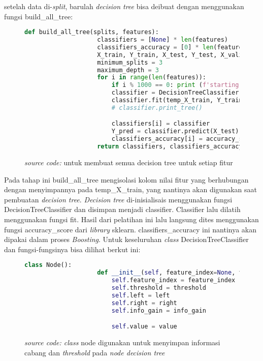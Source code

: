 		setelah data di-\textit{split}, barulah \emph{decision tree} bisa deibuat dengan menggunakan 
		fungsi build\_all\_tree:

		\begin{figure}[H]
			\begin{lstlisting}[language=Python, basicstyle=\tiny]
				def build_all_tree(splits, features):
					classifiers = [None] * len(features)
					classifiers_accuracy = [0] * len(features)
					X_train, Y_train, X_test, Y_test, X_valid, Y_valid = splits
					minimum_splits = 3
					maximum_depth = 3
					for i in range(len(features)):
						if i % 1000 == 0: print (f'starting tree {i}')
						classifier = DecisionTreeClassifier(minimum_splits, maximum_depth)
						classifier.fit(temp_X_train, Y_train)
						# classifier.print_tree()

						classifiers[i] = classifier
						Y_pred = classifier.predict(X_test)
						classifiers_accuracy[i] = accuracy_score(Y_test, Y_pred)
					return classifiers, classifiers_accuracy
			\end{lstlisting}
			\caption{\emph{source code:} untuk membuat semua decision tree untuk setiap fitur}
			\label{code: make all decision tree}
		\end{figure}

		Pada tahap ini build\_all\_tree mengisolasi kolom nilai fitur yang berhubungan 
		dengan menyimpannya pada temp\_X\_train, yang nantinya akan digunakan saat pembuatan 
		\emph{decision tree}. \emph{Decision tree} di-inisialisais menggunakan fungsi
		DecisionTreeClassifier dan disimpan menjadi classifier. 
		Classifier lalu dilatih menggunakan fungsi fit. Hasil dari pelatihan ini lalu langsung dites menggunakan 
		fungsi accuracy\_score dari \textit{library} sklearn. classifiers\_accuracy ini nantinya 
		akan dipakai dalam proses \emph{Boosting}. Untuk keseluruhan \textit{class} DecisionTreeClassifier 
		dan fungsi-fungsinya bisa dilihat berkut ini:

		\begin{figure}[H]
			\begin{lstlisting}[language=Python, basicstyle=\tiny]
				class Node():
					def __init__(self, feature_index=None, threshold=None, left=None, right=None, info_gain=None, value=None):
						self.feature_index = feature_index
						self.threshold = threshold
						self.left = left
						self.right = right
						self.info_gain = info_gain

						self.value = value
			\end{lstlisting}
			\caption{\emph{source code: class} node digunakan untuk menyimpan informasi cabang dan
			\textit{threshold} pada \emph{node decision tree}}
			\label{code: node class}
		\end{figure}	


